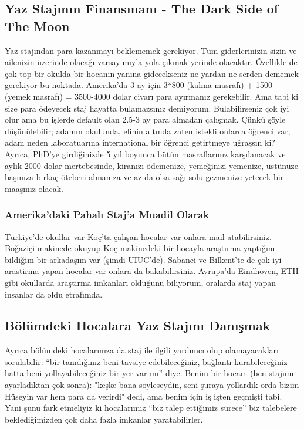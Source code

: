 \documentclass[12pt]{article}
\begin{document}
\subsection{Yaz Stajının Finansmanı - The Dark Side of The Moon}
Yaz stajından para kazanmayı beklememek gerekiyor. Tüm giderlerinizin sizin ve ailenizin üzerinde olacağı varsayımıyla yola çıkmak yerinde olacaktır. Özellikle de çok top bir okulda bir hocanın yanına gidecekseniz ne yardan ne serden dememek gerekiyor bu noktada. Amerika’da 3 ay için 3*800 (kalma masrafı) + 1500 (yemek masrafı) = 3500-4000 dolar civarı para ayırmanız gerekebilir. Ama tabi ki size para ödeyecek staj hayatta bulamazsınız demiyorum. Bulabilirseniz çok iyi olur ama bu işlerde default olan 2.5-3 ay para almadan çalışmak. Çünkü şöyle düşünülebilir;  adamın okulunda, elinin altında zaten istekli onlarca öğrenci var, adam neden laboratuarına international bir öğrenci getirtmeye uğraşsın ki? Ayrıca, PhD’ye girdiğinizde 5 yıl boyunca bütün masraflarınız karşılanacak ve aylık 2000 dolar mertebesinde, kiranızı ödemenize, yemeğinizi yemenize, üstünüze başınıza birkaç öteberi almanıza ve az da olsa sağı-solu gezmenize yetecek bir maaşınız olacak.

\subsubsection{Amerika’daki Pahalı Staj’a Muadil Olarak}
Türkiye’de okullar var Koç'ta çalışan hocalar var onlara mail atabilirsiniz. Boğaziçi makinede okuyup Koç makinedeki bir hocayla araştırma yaptığını bildiğim bir arkadaşım var (şimdi UIUC’de). Sabanci ve Bilkent'te de çok iyi arastirma yapan hocalar var onlara da bakabilirsiniz. Avrupa’da Eindhoven, ETH gibi okullarda araştırma imkanları olduğunu biliyorum, oralarda staj yapan insanlar da oldu etrafımda.

\subsection{Bölümdeki Hocalara Yaz Stajını Danışmak}
Ayrıca bölümdeki hocalarınıza da staj ile ilgili yardımcı olup olamayacakları sorulabilir: “bir tanıdığınız-beni tavsiye edebileceğiniz, bağlantı kurabileceğiniz hatta beni yollayabileceğiniz bir yer var mı” diye. Benim bir hocam (ben stajımı ayarladıktan çok sonra): "keşke bana soyleseydin, seni şuraya yollardık orda bizim Hüseyin var hem para da verirdi" dedi, ama benim için iş işten geçmişti tabi. Yani şunu fark etmeliyiz ki hocalarımız “biz talep ettiğimiz sürece” biz talebelere beklediğimizden çok daha fazla imkanlar yaratabilirler.
\end{document}
